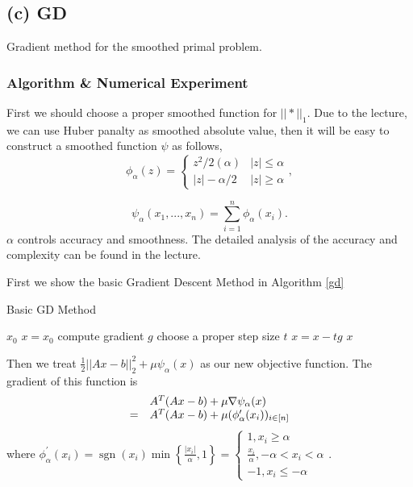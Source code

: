 \documentclass[]{article}
\begin{document}
\subsection{(c) GD}
\noindent
Gradient method for the smoothed primal problem.

\subsubsection{Algorithm \& Numerical Experiment}

First we should choose a proper smoothed function for $||*||_1$. Due to the lecture, we can use Huber panalty as smoothed absolute value, then it will be easy to construct a smoothed function $\psi$ as follows,
\begin{equation}
\phi_{\alpha}(z)=\left\{\begin{array}{ll}{z^{2} / 2(\alpha)} & {|z| \leq \alpha} \\ {|z|-\alpha / 2} & {|z| \geq \alpha}\end{array}\right. , 
\end{equation}

\begin{equation}
	\psi_{\alpha}(x_1, ... , x_n) = \sum_{i=1}^{n} \phi_{\alpha}(x_i).
\end{equation}
$\alpha$ controls accuracy and smoothness. The detailed analysis of the accuracy and complexity can be found in the lecture.

First we show the basic Gradient Descent Method in Algorithm \ref{gd}


\begin{algorithm}[!h]
	\caption{Basic GD Method}
	\label{gd}
	\begin{algorithmic}
		\REQUIRE $x_0$
		\STATE $x=x_0$
		\STATE compute gradient $g$
		\STATE choose a proper step size $t$
		\STATE $x=x-tg$
		\ENDWHILE
		\ENSURE $x$
	\end{algorithmic}
\end{algorithm}

Then we treat $\frac{1}{2}||Ax-b||_2^2 + \mu\psi_{\alpha}(x)$ as our new objective function. The gradient of this function is
\begin{equation}
\begin{array}{r l}
& A^T(Ax-b) + \mu\nabla\psi_{\alpha}(x)\\
=& A^T(Ax-b) + \mu(\phi_{\alpha}'(x_i))_{i\in[n]}\\
\end{array}
\end{equation}
 where $\phi_{\alpha}^{\prime}\left(x_{i}\right)=\operatorname{sgn}\left(x_{i}\right) \min \left\{\frac{\left|x_{i}\right|}{\alpha}, 1\right\}=\left\{\begin{array}{l}{1, x_{i} \geq \alpha} \\ {\frac{x_{i}}{\alpha},-\alpha<x_{i}<\alpha} \\ {-1, x_{i} \leq-\alpha}\end{array}\right.$.
 
\end{document}
